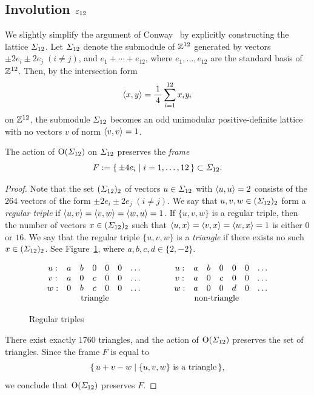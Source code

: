 \documentclass{amsart} %
\begin{document}
\subsection{Involution $\varepsilon_{12}$}\label{subsec:vep12}
%
We slightly simplify the argument of Conway~\cite[Chapter~10, Section~3.7]{theCSbook} 
by explicitly constructing the lattice $\varSigma_{12}$.
Let $\varSigma_{12}$ denote the submodule of $\mathord{\mathbb{Z}}^{12}$ generated by vectors 
$\pm 2 e_i\pm 2 e_j\; (i\ne j)$, 
and  $e_1+\cdots+e_{12}$,
where $e_1,\dots, e_{12}$ are the standard basis of $\mathord{\mathbb{Z}}^{12}$.
Then, by the intersection form 
\[
\langle x, y \rangle=\frac{1}{\,4\,} \sum_{i=1}^{12} x_i y_i
\]
on $\mathord{\mathbb{Z}}^{12}$, the submodule $\varSigma_{12}$ becomes an odd unimodular
positive-definite lattice with no vectors $v$ of norm $\langle v, v \rangle=1$.
%
\begin{lemma}\label{lem:frame}
The action of $\mathord{\mathrm{O}}(\varSigma_{12})$ on $\varSigma_{12}$ preserves
the \emph{frame}
\[
F:=\{\,{\pm 4 e_i}\mid {i=1, \dots, 12} \,\}\subset \varSigma_{12}.
\]
\end{lemma}
%
\begin{proof}
Note that the set $(\varSigma_{12})_2$ of vectors $u\in \varSigma_{12}$ with $\langle u, u \rangle=2$
consists of the $264$ vectors of the form $\pm 2 e_i\pm 2 e_j\; (i\ne j)$.
We say that $u, v, w\in( \varSigma_{12})_2$ form a \emph{regular triple} if 
$\langle u, v \rangle=\langle v, w \rangle=\langle w, u \rangle=1$.
If $\{u, v, w\}$ is a regular triple, then the number of 
vectors $x\in( \varSigma_{12})_2$ such that 
$\langle u, x \rangle=\langle v, x \rangle=\langle w, x \rangle=1$
is either $0$ or $16$.
We say that the regular triple $\{u, v, w\}$ is a \emph{triangle} if there exists no such $x\in (\varSigma_{12})_2$.
See Figure~\ref{fig:triangle},
where $a, b, c , d\in \{2, -2\}$.
%
\begin{figure}
{\small
\[
\begin{array}{ccccccc}
u: & a& b & 0 & 0 & 0 &\dots\\
v: &a&0 & c & 0 & 0 &\dots\\
w: & 0& b & c & 0 & 0 & \dots\\
& \rlap{\textrm{\;\;\;\;\;triangle}} && &
\end{array}
\qquad\quad
\begin{array}{ccccccc}
u: &a& b & 0 & 0 & 0 &\dots\\
v: &a&0 & c & 0 & 0 & \dots\\
w: &a& 0 & 0 & d & 0 & \dots\\
\rlap{ \textrm{\;\;\;\;\;non-triangle}} && & &
\end{array}
\]
}
\vskip -1mm
\caption{Regular triples}\label{fig:triangle}
\end{figure}
%
There exist exactly $1760$ triangles, and 
the action of $\mathord{\mathrm{O}}(\varSigma_{12})$ preserves the set of triangles.
Since 
 the frame $F$ is equal to
\[
\{\,{u+v-w}\mid {\textrm{$\{u, v, w\}$ is a triangle}} \,\},
\]
we conclude that $\mathord{\mathrm{O}}(\varSigma_{12})$ preserves $F$.
\end{proof}
\end{document}
